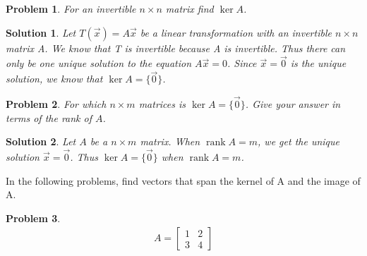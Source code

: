 \documentclass{article}
\newtheorem{problem}{Problem}
\newtheorem*{solution}{Solution}
\DeclareMathOperator{\Rank}{rank}
\begin{document}
\begin{problem}
For an invertible $n \times n$ matrix find $\ker A$.
\end{problem}

\begin{solution}
Let $T(\vec{x}) = A\vec{x}$ be a linear transformation with an invertible $n \times n$ matrix A. We know that T is invertible because A is invertible. Thus there can only be one unique solution to the equation $A\vec{x} = 0$. Since $\vec{x} = \vec{0}$ is the unique solution, we know that $\ker A = \{\vec{0}\}$.
\end{solution}

\begin{problem}
For which $n \times m$ matrices is $\ker A = \{\vec{0}\}$. Give your answer in terms of the rank of $A$.
\end{problem}

\begin{solution}
Let $A$ be a $n \times m$ matrix. When $\Rank A = m$, we get the unique solution $\vec{x} = \vec{0}$. Thus $\ker A = \{ \vec{0} \}$ when $\Rank A = m$.
\end{solution}

In the following problems, find vectors that span the kernel of A and the image of A. 

\begin{problem}
\begin{align*}
A = \begin{bmatrix}1 & 2 \\ 3 & 4 \end{bmatrix}
\end{align*}
\end{problem}
\end{document}
